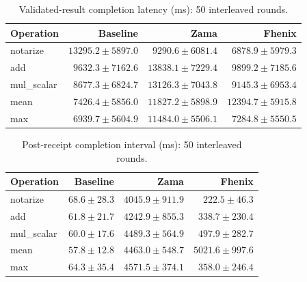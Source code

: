 \begin{table}[!t]
\centering\small
\caption{Validated-result completion latency (ms): 50 interleaved rounds.}
\label{tab:lifecycle-transactionToValidatedPlaintextMs}
\begin{tabular}{lrrr}
\hline
Operation & Baseline & Zama & Fhenix \\
\hline
notarize & \(13295.2 \pm 5897.0\) & \(9290.6 \pm 6081.4\) & \(6878.9 \pm 5979.3\) \\
add & \(9632.3 \pm 7162.6\) & \(13838.1 \pm 7229.4\) & \(9899.2 \pm 7185.6\) \\
mul\_scalar & \(8677.3 \pm 6824.7\) & \(13126.3 \pm 7043.8\) & \(9145.3 \pm 6953.4\) \\
mean & \(7426.4 \pm 5856.0\) & \(11827.2 \pm 5898.9\) & \(12394.7 \pm 5915.8\) \\
max & \(6939.7 \pm 5604.9\) & \(11484.0 \pm 5506.1\) & \(7284.8 \pm 5550.5\) \\
\hline
\end{tabular}
\end{table}

\begin{table}[!t]
\centering\small
\caption{Post-receipt completion interval (ms): 50 interleaved rounds.}
\label{tab:lifecycle-postReceiptToValidatedPlaintextMs}
\begin{tabular}{lrrr}
\hline
Operation & Baseline & Zama & Fhenix \\
\hline
notarize & \(68.6 \pm 28.3\) & \(4045.9 \pm 911.9\) & \(222.5 \pm 46.3\) \\
add & \(61.8 \pm 21.7\) & \(4242.9 \pm 855.3\) & \(338.7 \pm 230.4\) \\
mul\_scalar & \(60.0 \pm 17.6\) & \(4489.3 \pm 564.9\) & \(497.9 \pm 282.7\) \\
mean & \(57.8 \pm 12.8\) & \(4463.0 \pm 548.7\) & \(5021.6 \pm 997.6\) \\
max & \(64.3 \pm 35.4\) & \(4571.5 \pm 374.1\) & \(358.0 \pm 246.4\) \\
\hline
\end{tabular}
\end{table}

